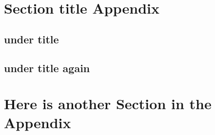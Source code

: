 \section{Section title Appendix}
\lipsum[1]

\subsection{under title}
\lipsum[2-3]

\subsection{under title again}
\lipsum[4-5]

\section{Here is another Section in the Appendix}
\lipsum[6-7]

